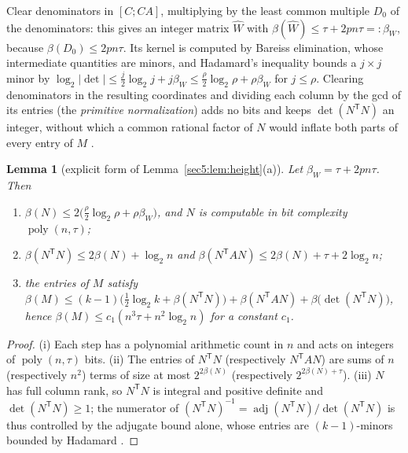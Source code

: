 \documentclass[journal]{IEEEtran}
\theoremstyle{plainn}
\newtheorem{lem}[thm]{Lemma}
\theoremstyle{remark}
\newcommand{\poly}{\operatorname{poly}}
\begin{document}
Clear denominators in $[C;CA]$, multiplying by the least common multiple $D_0$ of the denominators:
this gives an integer matrix $\widehat W$ with $\beta(\widehat W)\le\tau+2pn\tau=:\beta_W$, because
$\beta(D_0)\le2pn\tau$. Its kernel is computed by Bareiss elimination, whose intermediate quantities
are minors, and Hadamard's inequality bounds a $j\times j$ minor by
$\log_2|\det|\le\frac{j}{2}\log_2 j+j\beta_W\le\frac{\rho}{2}\log_2\rho+\rho\beta_W$ for
$j\le\rho$. Clearing denominators in the resulting coordinates and dividing each column by the gcd of
its entries (the \emph{primitive normalization}) adds no bits and keeps $\det(N^{\mathsf T}N)$ an
integer, without which a common rational factor of $N$ would inflate both parts of every entry of $M$
\cite{hj13,vzgg03}.

\begin{lem}[explicit form of Lemma~\ref{sec5:lem:height}(a)]\label{appBC:lem:norm}\label{appBC:lem:comp}\label{appBC:cor:comp}
Let $\beta_W=\tau+2pn\tau$. Then
\begin{enumerate}[label=(\roman*),leftmargin=*]
\item $\beta(N)\le2\bigl(\frac{\rho}{2}\log_2\rho+\rho\beta_W\bigr)$, and $N$ is computable in bit
complexity $\poly(n,\tau)$;
\item $\beta(N^{\mathsf T}N)\le2\beta(N)+\log_2 n$ and
$\beta(N^{\mathsf T}AN)\le2\beta(N)+\tau+2\log_2 n$;
\item the entries of $M$ satisfy
$\beta(M)\le(k-1)\bigl(\tfrac12\log_2 k+\beta(N^{\mathsf T}N)\bigr)+\beta(N^{\mathsf T}AN)+\beta\bigl(\det(N^{\mathsf T}N)\bigr)$,
hence $\beta(M)\le c_1(n^{3}\tau+n^{2}\log_2 n)$ for a constant $c_1$.
\end{enumerate}
\end{lem}

\begin{proof}
(i) Each step has a polynomial arithmetic count in $n$ and acts on integers of $\poly(n,\tau)$ bits.
(ii) The entries of $N^{\mathsf T}N$ (respectively $N^{\mathsf T}AN$) are sums of $n$ (respectively
$n^{2}$) terms of size at most $2^{2\beta(N)}$ (respectively $2^{2\beta(N)+\tau}$). (iii) $N$ has full
column rank, so $N^{\mathsf T}N$ is integral and positive definite and $\det(N^{\mathsf T}N)\ge1$; the
numerator of $(N^{\mathsf T}N)^{-1}=\operatorname{adj}(N^{\mathsf T}N)/\det(N^{\mathsf T}N)$ is thus
controlled by the adjugate bound alone, whose entries are $(k-1)$-minors bounded by Hadamard
\cite{hj13,vzgg03}.
\end{proof}
\end{document}
